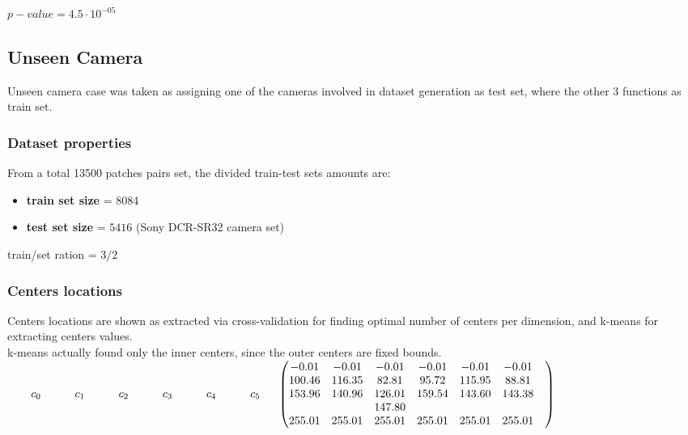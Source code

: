 	
	$p-value = 4.5 \cdot 10 ^{-05}$
	
	
	

\subsection{Unseen Camera}

Unseen camera case was taken as assigning one of the cameras involved in dataset generation as test set, where the other 3 functions as train set.


	\subsubsection{Dataset properties}
	
		From a total 13500 patches pairs set, the divided train-test sets amounts are:
		\begin{itemize}
			\item \textbf{train set size} = $8084$ 
			\item \textbf{test set size} = $5416$ (Sony DCR-SR32 camera set)
		\end{itemize}
		
		train/set ration = $3/2$

	\subsubsection{Centers locations}
	
	Centers locations are shown as extracted via cross-validation for finding optimal number of centers per dimension, and k-means for extracting centers values. \\
	k-means actually found only the inner centers, since the outer centers are fixed bounds.\\


	$
	\begin{matrix}  \qquad  c_0 \quad  \qquad c_1 \quad  \qquad c_2 \qquad \quad  c_3 \qquad \quad c_4 \qquad \quad c_5 \quad \end{matrix}\\
			
	
	\begin{pmatrix}
			     -0.01 &     -0.01 &    -0.01 & -0.01   & -0.01   & -0.01    \\
				100.46 &   116.35 &    82.81 &    95.72 & 115.95 & 88.81     \\
				153.96 &   140.96 &   126.01 &   159.54 & 143.60 & 143.38    \\
				       &          &   147.80 &          &        &             \\
	     		 255.01 &  255.01 &   255.01 &   255.01 &  255.01 &  255.01 & \\
			\end{pmatrix}
	$ 
\\
	

